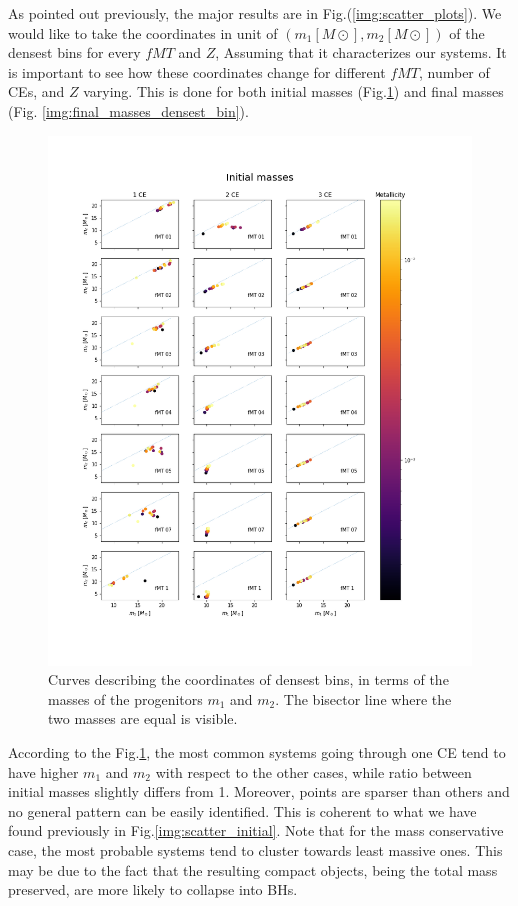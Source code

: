 \documentclass[preprint,12pt]{elsarticle}
\begin{document}
As pointed out previously, the major results are in Fig.(\ref{img:scatter_plots}). We would like to take the coordinates in unit of $(m_1 [M \odot], m_2 [M \odot]) $ of the densest bins for every $fMT$ and $Z$, Assuming that it characterizes our systems. It is important to see how these coordinates change for different $fMT$, number of CEs, and $Z$ varying. This is done for both initial masses (Fig.\ref{img:initial_masses_densest_bin}) and final masses (Fig. \ref{img:final_masses_densest_bin}).

\begin{figure}[htp]
    \centering
    \includegraphics[width=1\textwidth]{Images/center_densities_initial.png}
    \caption{Curves describing the coordinates of densest bins, in terms of the masses of the progenitors $m_1$ and $m_2$. The bisector line where the two masses are equal is visible. }
    \label{img:initial_masses_densest_bin}
  \end{figure}
  
According to the Fig.\ref{img:initial_masses_densest_bin}, the most common systems going through one CE tend to have higher $m_1$ and $m_2$ with respect to the other cases, while ratio between initial masses slightly differs from 1. Moreover, points are sparser than others and no general pattern can be easily identified. This is coherent to what we have found previously in Fig.\ref{img:scatter_initial}. Note that for the mass conservative case, the most probable systems tend to cluster towards least massive ones. This may be due to the fact that the resulting compact objects, being the total mass preserved, are more likely to collapse into BHs.\\
\end{document}

